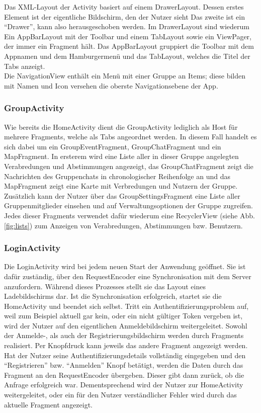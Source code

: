 \documentclass[parskip=full,11pt]{scrartcl}
\begin{document}

Das XML-Layout der Activity basiert auf einem DrawerLayout. Dessen erstes Element
ist der eigentliche Bildschirm, den der Nutzer sieht Das zweite ist ein
\enquote{Drawer}, kann also herausgeschoben werden. Im DrawerLayout sind wiederum
Ein AppBarLayout mit der Toolbar und einem TabLayout sowie ein ViewPager, der
immer ein Fragment hält. Das AppBarLayout gruppiert die Toolbar mit dem Appnamen und
dem Hamburgermenü und das TabLayout, welches die Titel der Tabs anzeigt.
\\Die NavigationView enthält ein Menü mit einer Gruppe an Items; diese bilden mit
Namen und Icon versehen die oberste Navigationsebene der App.

\subsubsection{GroupActivity}

Wie bereits die HomeActivity dient die GroupActivity lediglich als Host für
mehrere Fragments, welche als Tabs angeordnet werden. In diesem Fall
handelt es sich dabei um ein GroupEventFragment, GroupChatFragment und ein
MapFragment. In ersterem wird eine Liste aller in dieser Gruppe angelegten
Verabredungen und Abstimmungen angezeigt, das GroupChatFragment zeigt die
Nachrichten des Gruppenchats in chronologischer Reihenfolge an und das
MapFragment zeigt eine Karte mit Verbredungen und Nutzern der Gruppe.
Zusätzlich kann der Nutzer über das GroupSettingsFragment eine Liste aller
Gruppenmitglieder einsehen und auf Verwaltungsoptionen der Gruppe zugreifen.
Jedes dieser Fragments verwendet dafür wiederum eine RecyclerView
(siehe Abb.\ref{fig:lists}) zum Anzeigen von Verabredungen, Abstimmungen
bzw. Benutzern.

\subsubsection{LoginActivity}

Die LoginActivity wird bei jedem neuen Start der Anwendung geöffnet. Sie ist
dafür zuständig, über den RequestEncoder eine Synchronisation mit dem Server
anzufordern. Während dieses Prozesses stellt sie das Layout eines
Ladebildschirms dar. Ist die Synchronisation erfolgreich, startet sie die
HomeActivity und beendet sich selbst. Tritt ein Authentifizierungsproblem auf,
weil zum Beispiel aktuell gar kein, oder ein nicht gültiger Token vergeben ist,
wird der Nutzer auf den eigentlichen Anmeldebildschirm weitergeleitet. Sowohl der
Anmelde-, als auch der Registrierungsbildschirm werden durch Fragments realisiert.
Per Knopfdruck kann jeweils das andere Fragment angezeigt werden. Hat der
Nutzer seine Authentifizierungsdetails vollständig eingegeben und den
\enquote{Registrieren} bzw. \enquote{Anmelden} Knopf betätigt, werden die Daten
durch das Fragment an den RequestEncoder übergeben. Dieser gibt dann zurück, ob
die Anfrage erfolgreich war. Dementsprechend wird der Nutzer zur HomeActivity
weitergeleitet, oder ein für den Nutzer verständlicher Fehler wird durch das
aktuelle Fragment angezeigt.
\end{document}
